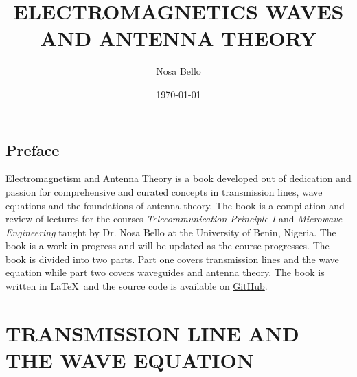 \documentclass[a4paper,10pt, two column]{book}
\begin{document}
\author{Nosa Bello}
\title{ELECTROMAGNETICS WAVES AND ANTENNA THEORY}
\date{\today}

\frontmatter
\maketitle
\tableofcontents

\chapter{Preface}
Electromagnetism and Antenna Theory is a book developed out of dedication and passion for comprehensive and curated concepts in transmission lines, wave equations and the foundations of antenna theory. The book is a compilation and review of lectures for the courses \textit{Telecommunication Principle I} and \textit{Microwave Engineering} taught by Dr. Nosa Bello at the University of Benin, Nigeria. The book is a work in progress and will be updated as the course progresses. The book is divided into two parts. Part one covers transmission lines and the wave equation while part two covers waveguides and antenna theory. The book is written in \LaTeX\ and the source code is available on \href{https://github.com/allisonoge/electromagnetism-and-antenna-theory-v2.git}{GitHub}.

\mainmatter

\part{TRANSMISSION LINE AND THE WAVE EQUATION}


















 
 
 
 
 
 
 
 
 
 
 
 
 
 
 
 
 
 
 

\backmatter
\printindex

\shipoutAnswer
\end{document}
